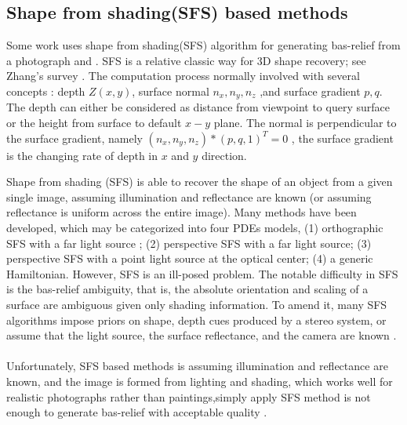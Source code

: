 \subsection{Shape from shading(SFS) based methods}
Some work uses shape from shading(SFS) algorithm for generating  bas-relief from a photograph\cite{zeng2014region}\cite{wu2013making} and \cite{alexa2010reliefs}\cite{wu2008interactive}. SFS is a relative classic way for 3D shape recovery; see Zhang's survey \cite{zhang1999shape}.  The computation process normally involved with several concepts : depth $Z(x,y)$, surface normal $n_x,n_y,n_z$ ,and surface gradient $p,q$. The depth can either be considered as distance from viewpoint to query surface or the height from surface to default $x-y$ plane. The normal is perpendicular to the surface gradient, namely $\left( n_x,n_y,n_z\right) * \left( p, q ,1\right)^T =0  $ , the surface gradient is the changing rate of depth in $x$ and $y$ direction.

Shape from shading (SFS) is able to recover the shape of an object from a given single image, assuming illumination and reflectance are known (or assuming reflectance is uniform across the entire image). Many methods have been developed, which may be categorized into four PDEs models\cite{prados2003perspective}, (1) orthographic SFS with a far light source \cite{lions1993shape}; (2) perspective SFS with a far light source\cite{prados2004unifying}; (3) perspective SFS with a point light source at the optical center\cite{prados2003perspective}; (4) a generic Hamiltonian. However, SFS is an ill-posed problem. The notable difficulty in SFS is the bas-relief ambiguity\cite{belhumeur1999bas}, that is, the absolute orientation and scaling of a surface are ambiguous given only shading information. To amend it, many SFS algorithms impose priors on shape, depth cues produced by a stereo system, or assume that the light source, the surface reflectance, and the camera are known\cite{zhang1999shape} \cite{alldrin2007resolving} \cite{johnson2011shape} \cite{barron2012color}.\\ \\
Unfortunately, SFS based methods is assuming illumination and reflectance are known, and the image is formed from lighting and shading, which works well for realistic photographs rather than paintings,simply apply SFS method is not enough to generate bas-relief with acceptable quality .  

